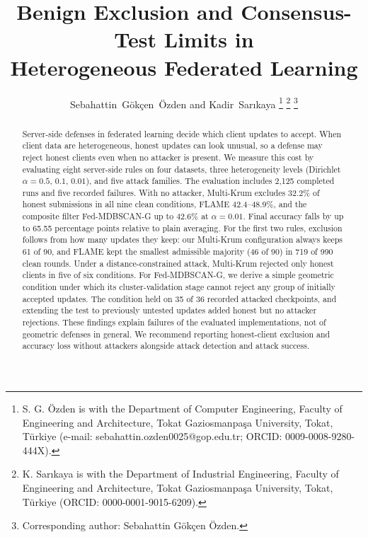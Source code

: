 \documentclass[journal]{IEEEtran}
\begin{document}
\title{Benign Exclusion and Consensus-Test Limits in\\Heterogeneous Federated Learning}

\author{Sebahattin~G\"ok\c{c}en~\"Ozden and Kadir~Sar{\i}kaya%
\thanks{S. G. \"Ozden is with the Department of Computer Engineering, Faculty of Engineering and Architecture, Tokat Gaziosmanpa\c{s}a University, Tokat, T\"urkiye (e-mail: sebahattin.ozden0025@gop.edu.tr; ORCID: \mbox{0009-0008-9280-444X}).}%
\thanks{K. Sar{\i}kaya is with the Department of Industrial Engineering, Faculty of Engineering and Architecture, Tokat Gaziosmanpa\c{s}a University, Tokat, T\"urkiye (ORCID: \mbox{0000-0001-9015-6209}).}%
\thanks{Corresponding author: Sebahattin G\"ok\c{c}en \"Ozden.}}

\maketitle

\begin{abstract}
Server-side defenses in federated learning decide which client updates to accept. When client data are heterogeneous, honest updates can look unusual, so a defense may reject honest clients even when no attacker is present. We measure this cost by evaluating eight server-side rules on four datasets, three heterogeneity levels (Dirichlet $\alpha=0.5$, $0.1$, $0.01$), and five attack families. The evaluation includes 2,125 completed runs and five recorded failures. With no attacker, Multi-Krum excludes 32.2\% of honest submissions in all nine clean conditions, FLAME 42.4--48.9\%, and the composite filter Fed-MDBSCAN-G up to 42.6\% at $\alpha=0.01$. Final accuracy falls by up to 65.55 percentage points relative to plain averaging. For the first two rules, exclusion follows from how many updates they keep: our Multi-Krum configuration always keeps 61 of 90, and FLAME kept the smallest admissible majority (46 of 90) in 719 of 990 clean rounds. Under a distance-constrained attack, Multi-Krum rejected only honest clients in five of six conditions. For Fed-MDBSCAN-G, we derive a simple geometric condition under which its cluster-validation stage cannot reject any group of initially accepted updates. The condition held on 35 of 36 recorded attacked checkpoints, and extending the test to previously untested updates added honest but no attacker rejections. These findings explain failures of the evaluated implementations, not of geometric defenses in general. We recommend reporting honest-client exclusion and accuracy loss without attackers alongside attack detection and attack success.
\end{abstract}
\end{document}
